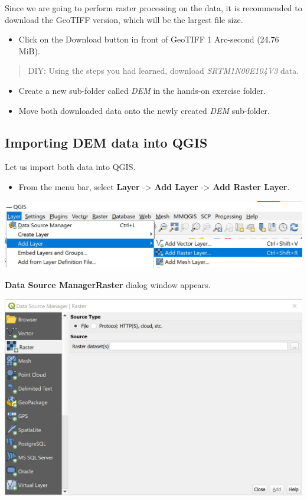 \documentclass[
  letterpaper,
  DIV=11,
  numbers=noendperiod]{scrreprt}
\providecommand{\tightlist}{%
  \setlength{\itemsep}{0pt}\setlength{\parskip}{0pt}}\usepackage{longtable,booktabs,array}
\begin{document}
Since we are going to perform raster processing on the data, it is
recommended to download the GeoTIFF version, which will be the largest
file size.

\begin{itemize}
\tightlist
\item
  Click on the Download button in front of GeoTIFF 1 Arc-second (24.76
  MiB).
\end{itemize}

\begin{quote}
DIY: Using the steps you had learned, download \emph{SRTM1N00E104V3}
data.
\end{quote}

\begin{itemize}
\item
  Create a new sub-folder called \emph{DEM} in the hands-on exercise
  folder.
\item
  Move both downloaded data onto the newly created \emph{DEM}
  sub-folder.
\end{itemize}

\hypertarget{importing-dem-data-into-qgis}{%
\subsection{Importing DEM data into
QGIS}\label{importing-dem-data-into-qgis}}

Let us import both data into QGIS.

\begin{itemize}
\tightlist
\item
  From the menu bar, select \textbf{Layer} -\textgreater{} \textbf{Add
  Layer} -\textgreater{} \textbf{Add Raster Layer}.
\end{itemize}

\includegraphics{./img06/image33.jpg}

\textbf{Data Source Manager\textbar Raster} dialog window appears.

\includegraphics{./img06/image34.jpg}
\end{document}
